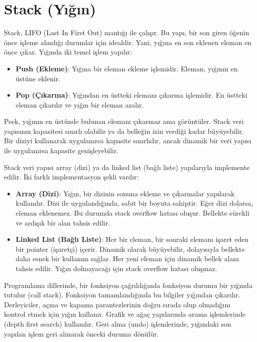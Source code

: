 \section{Stack (Yığın)}

Stack, LIFO (Last In First Out) mantığı ile çalışır. Bu yapı, bir son giren öğenin önce işleme alındığı durumlar için idealdir. Yani, yığına en son eklenen eleman en önce çıkar. Yığında iki temel işlem yapılır:

\begin{itemize}
    \item \textbf{Push (Ekleme)}: Yığına bir eleman ekleme işlemidir. Eleman, yığının en üstüne eklenir.
    \item \textbf{Pop (Çıkarma)}: Yığından en üstteki elemanı çıkarma işlemidir. En üstteki eleman çıkarılır ve yığın bir eleman azalır.
\end{itemize}

Peek, yığının en üstünde bulunan elemanı çıkarmaz ama görüntüler. Stack veri yapısının kapasitesi sınırlı olabilir ya da belleğin izin verdiği kadar büyüyebilir. Bir diziyi kullanarak uygulanırsa kapasite sınırlıdır, ancak dinamik bir veri yapısı ile uygulanırsa kapasite genişleyebilir.

Stack veri yapısı array (dizi) ya da linked list (bağlı liste) yapılarıyla implemente edilir. İki farklı implementasyon şekli vardır:

\begin{itemize}
    \item \textbf{Array (Dizi)}: Yığın, bir dizinin sonuna ekleme ve çıkarmalar yapılarak kullanılır. Dizi ile uygulandığında, sabit bir boyuta sahiptir. Eğer dizi dolarsa, eleman eklenemez. Bu durumda stack overflow hatası oluşur. Bellekte sürekli ve ardışık bir alan tahsis edilir.
    \item \textbf{Linked List (Bağlı Liste)}: Her bir eleman, bir sonraki elemanı işaret eden bir pointer (işaretçi) içerir. Dinamik olarak büyüyebilir, dolayısıyla bellekte daha esnek bir kullanım sağlar. Her yeni eleman için dinamik bellek alanı tahsis edilir. Yığın dolmayacağı için stack overflow hatası oluşmaz.
\end{itemize}

Programlama dillerinde, bir fonksiyon çağrıldığında fonksiyon durumu bir yığında tutulur (call stack). Fonksiyon tamamlandığında bu bilgiler yığından çıkarılır. Derleyiciler, açma ve kapama parantezlerinin doğru sırada olup olmadığını kontrol etmek için yığın kullanır. Grafik ve ağaç yapılarında arama işlemlerinde (depth first search) kullanılır. Geri alma (undo) işlemlerinde, yığındaki son yapılan işlem geri alınarak önceki duruma dönülür.

